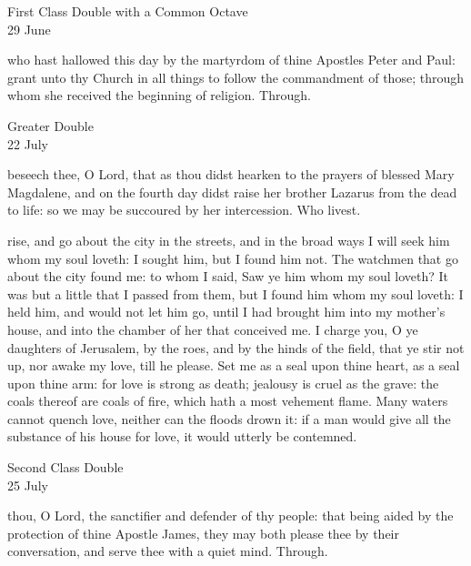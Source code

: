 \begin{inhead}
    {First Class Double with a Common Octave\\
29 June}
\end{inhead}

\collect
{} who hast hallowed this day by the martyrdom of thine Apostles Peter and Paul: grant unto thy Church in all things to follow the commandment of those; through whom she received the beginning of religion. Through.

\begin{inhead}
    {Greater Double\\
22 July}
\end{inhead}

\collect
{} beseech thee, O Lord, that as thou didst hearken to the prayers of blessed Mary Magdalene, and on the fourth day didst raise her brother Lazarus from the dead to life: so we may be succoured by her intercession. Who livest.

 rise, and go about the city in the streets, and in the broad ways I will seek him whom my soul loveth: I sought him, but I found him not. The watchmen that go about the city found me: to whom I said, Saw ye him whom my soul loveth? It was but a little that I passed from them, but I found him whom my soul loveth: I held him, and would not let him go, until I had brought him into my mother's house, and into the chamber of her that conceived me. I charge you, O ye daughters of Jerusalem, by the roes, and by the hinds of the field, that ye stir not up, nor awake my love, till he please. Set me as a seal upon thine heart, as a seal upon thine arm: for love is strong as death; jealousy is cruel as the grave: the coals thereof are coals of fire, which hath a most vehement flame. Many waters cannot quench love, neither can the floods drown it: if a man would give all the substance of his house for love, it would utterly be contemned.

\begin{inhead}
    {Second Class Double\\
25 July}
\end{inhead}

\collect
{} thou, O Lord, the sanctifier and defender of thy people: that being aided by the protection of thine Apostle James, they may both please thee by their conversation, and serve thee with a quiet mind. Through.


